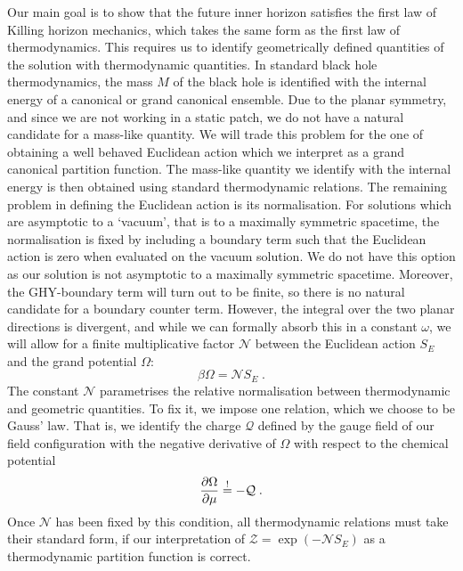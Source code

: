 Our main goal is to show that the future inner horizon satisfies the first law of Killing horizon mechanics, which takes the same form as the first law of thermodynamics. This requires us to identify geometrically defined quantities of the solution with thermodynamic quantities. In standard black hole thermodynamics, the mass $M$ of the black hole is identified with the internal energy of a canonical or grand canonical ensemble. Due to the planar symmetry, and since we are not working in a static patch, we do not have a natural candidate for a mass-like quantity. We will trade this problem for the one of obtaining a well behaved Euclidean action which we interpret as a grand canonical partition function. The mass-like quantity we identify with the internal energy is then obtained using standard thermodynamic relations. The remaining problem in defining the Euclidean action is its normalisation. For solutions which are asymptotic to a `vacuum',  that is to a maximally symmetric spacetime, the normalisation is fixed by including a boundary term such that the Euclidean action is zero when evaluated on the vacuum solution. We do not have this option as our solution is not asymptotic to a maximally symmetric spacetime. Moreover, the GHY-boundary term will turn out to be finite, so there is no natural candidate for a boundary counter term. However, the integral over the two planar directions is divergent, and while we can formally absorb this in a constant $\omega$, we will allow for a finite multiplicative factor $\mathcal{N}$ between the Euclidean action $S_E$ and the grand potential $\Omega$:
\begin{equation}
\beta \Omega = \mathcal{N} S_E \;.
\end{equation}
The constant $\mathcal{N}$ parametrises the relative normalisation between thermodynamic and geometric quantities. To fix it, we impose one relation, which we choose to be Gauss' law. That is, we identify the charge $\mathcal{Q}$ defined by the gauge field of our field configuration with the negative derivative of $\Omega$ with respect to the chemical potential
\begin{equation}
\label{eq:EMBoundary}
    \frac{\partial \Omega}{\partial \mu} \overset{!}{=} - \mathcal{Q} \;.
\end{equation} 
Once $\mathcal{N}$ has been fixed by this condition, all thermodynamic relations must take their standard form, if our interpretation of $\mathcal{Z} = \exp( -\mathcal{N} S_E)$ as a thermodynamic partition function is correct. 

